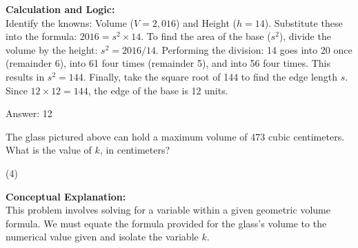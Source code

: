 \documentclass[11pt,paper=a4,answers]{exam}
\begin{document}
\begin{questions}
\begin{solution}
\vspace{30pt}

\textbf{Calculation and Logic:} \\
Identify the knowns: Volume ($V = 2,016$) and Height ($h = 14$). Substitute these into the formula: $2016 = s^2 \times 14$. To find the area of the base ($s^2$), divide the volume by the height: $s^2 = 2016 / 14$. Performing the division: 14 goes into 20 once (remainder 6), into 61 four times (remainder 5), and into 56 four times. This results in $s^2 = 144$. Finally, take the square root of 144 to find the edge length $s$. Since $12 \times 12 = 144$, the edge of the base is 12 units.

\vspace{30pt}

Answer: \colorbox{yellow!100}{12}
\end{solution}

\vspace{60pt}

\question
\begin{center}
\end{center}
The glass pictured above can hold a maximum volume of 473 cubic centimeters. What is the value of $k$, in centimeters?
\begin{tasks}(4)
\end{tasks}

\begin{solution}
\textbf{Conceptual Explanation:} \\
This problem involves solving for a variable within a given geometric volume formula. We must equate the formula provided for the glass's volume to the numerical value given and isolate the variable $k$.

\vspace{30pt}


\end{solution}
\end{questions}
\end{document}
